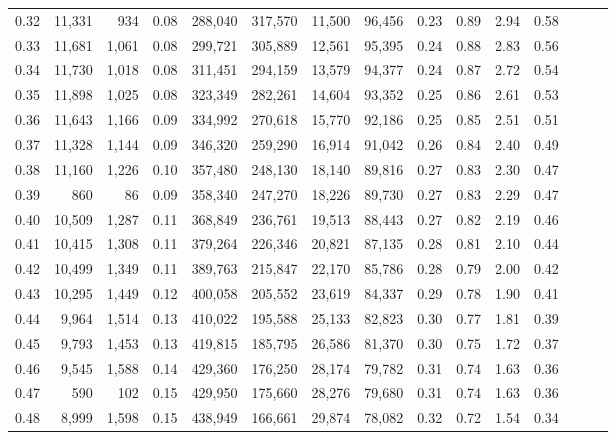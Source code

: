 \begin{tabular}{rrrrrrrrrrrrrrr}
0.32 &  11,331 &    934 &  0.08 &  288,040 &  317,570 &   11,500 &   96,456 &  0.23 &  0.89 &  2.94 &      0.58 \\
0.33 &  11,681 &  1,061 &  0.08 &  299,721 &  305,889 &   12,561 &   95,395 &  0.24 &  0.88 &  2.83 &      0.56 \\
0.34 &  11,730 &  1,018 &  0.08 &  311,451 &  294,159 &   13,579 &   94,377 &  0.24 &  0.87 &  2.72 &      0.54 \\
0.35 &  11,898 &  1,025 &  0.08 &  323,349 &  282,261 &   14,604 &   93,352 &  0.25 &  0.86 &  2.61 &      0.53 \\
0.36 &  11,643 &  1,166 &  0.09 &  334,992 &  270,618 &   15,770 &   92,186 &  0.25 &  0.85 &  2.51 &      0.51 \\
0.37 &  11,328 &  1,144 &  0.09 &  346,320 &  259,290 &   16,914 &   91,042 &  0.26 &  0.84 &  2.40 &      0.49 \\
0.38 &  11,160 &  1,226 &  0.10 &  357,480 &  248,130 &   18,140 &   89,816 &  0.27 &  0.83 &  2.30 &      0.47 \\
0.39 &     860 &     86 &  0.09 &  358,340 &  247,270 &   18,226 &   89,730 &  0.27 &  0.83 &  2.29 &      0.47 \\
0.40 &  10,509 &  1,287 &  0.11 &  368,849 &  236,761 &   19,513 &   88,443 &  0.27 &  0.82 &  2.19 &      0.46 \\
0.41 &  10,415 &  1,308 &  0.11 &  379,264 &  226,346 &   20,821 &   87,135 &  0.28 &  0.81 &  2.10 &      0.44 \\
0.42 &  10,499 &  1,349 &  0.11 &  389,763 &  215,847 &   22,170 &   85,786 &  0.28 &  0.79 &  2.00 &      0.42 \\
0.43 &  10,295 &  1,449 &  0.12 &  400,058 &  205,552 &   23,619 &   84,337 &  0.29 &  0.78 &  1.90 &      0.41 \\
0.44 &   9,964 &  1,514 &  0.13 &  410,022 &  195,588 &   25,133 &   82,823 &  0.30 &  0.77 &  1.81 &      0.39 \\
0.45 &   9,793 &  1,453 &  0.13 &  419,815 &  185,795 &   26,586 &   81,370 &  0.30 &  0.75 &  1.72 &      0.37 \\
0.46 &   9,545 &  1,588 &  0.14 &  429,360 &  176,250 &   28,174 &   79,782 &  0.31 &  0.74 &  1.63 &      0.36 \\
0.47 &     590 &    102 &  0.15 &  429,950 &  175,660 &   28,276 &   79,680 &  0.31 &  0.74 &  1.63 &      0.36 \\
0.48 &   8,999 &  1,598 &  0.15 &  438,949 &  166,661 &   29,874 &   78,082 &  0.32 &  0.72 &  1.54 &      0.34 \\

\end{tabular}
